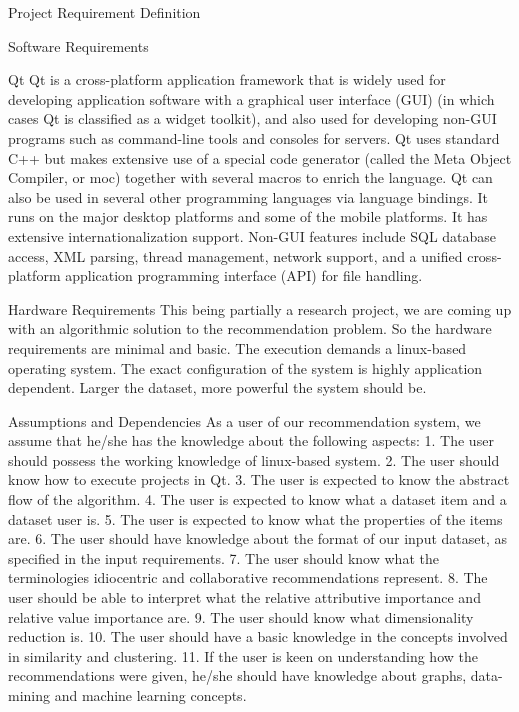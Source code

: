 \documentclass{report}
\begin{document}
\begin{projChapter}{Project Requirement Definition}
\begin{projSection}{Software Requirements}
  \begin{projSubSection}{Qt}
  Qt is a cross-platform application framework that is widely used for developing application software with a graphical user interface (GUI) (in which cases Qt is classified as a widget toolkit), and also used for developing non-GUI programs such as command-line tools and consoles for servers. Qt uses standard C++ but makes extensive use of a special code generator (called the Meta Object Compiler, or moc) together with several macros to enrich the language. Qt can also be used in several other programming languages via language bindings. It runs on the major desktop platforms and some of the mobile platforms. It has extensive internationalization support. Non-GUI features include SQL database access, XML parsing, thread management, network support, and a unified cross-platform application programming  interface (API) for file handling.
  \end{projSubSection}
 \end{projSection}
 
 \begin{projSection}{Hardware Requirements}
    This being partially a research project, we are coming up with an algorithmic solution to the recommendation problem. So the hardware requirements are minimal and basic. The execution demands a linux-based operating system. The exact configuration of the system is highly application dependent. Larger the dataset, more powerful the system should be.
 \end{projSection}

 \begin{projSection}{Assumptions and Dependencies}
  As a user of our recommendation system, we assume that he/she has the knowledge about the following aspects:
1. The user should possess the working knowledge of linux-based system.
2. The user should know how to execute projects in Qt.
3. The user is expected to know the abstract flow of the algorithm.
4. The user is expected to know what a dataset item and a dataset user is.
5. The user is expected to know what the properties of the items are.
6. The user should have knowledge about the format of our input dataset, as specified in the input requirements.
7. The user should know what the terminologies idiocentric and collaborative recommendations represent.
8. The user should be able to interpret what the relative attributive importance and relative value importance are.
9. The user should know what dimensionality reduction is.
10. The user should have a basic knowledge in the concepts involved in similarity and clustering.
11. If the user is keen on understanding how the recommendations were given, he/she should have knowledge about graphs, data-mining and machine learning concepts.


\end{projSection}
\end{projChapter}
\end{document}
